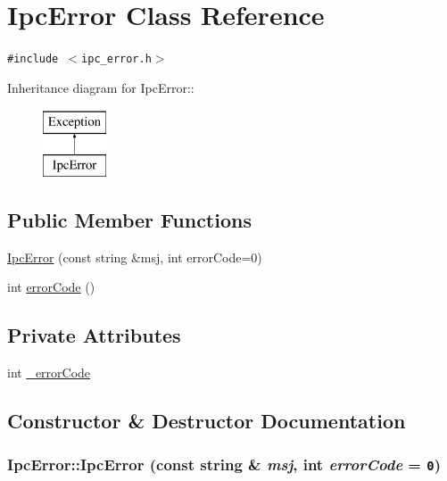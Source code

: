\hypertarget{classIpcError}{
\section{IpcError Class Reference}
\label{classIpcError}
}
{\tt \#include $<$ipc\_\-error.h$>$}

Inheritance diagram for IpcError::\begin{figure}[H]
\begin{center}
\leavevmode
\includegraphics[height=2cm]{classIpcError}
\end{center}
\end{figure}
\subsection*{Public Member Functions}
\begin{CompactItemize}
\item 
\hyperlink{classIpcError_daad480b7616244be5e2610d72a7aaa4}{IpcError} (const string \&msj, int errorCode=0)
\item 
int \hyperlink{classIpcError_f8aa4933424ab14450ba84580ed3d499}{errorCode} ()
\end{CompactItemize}
\subsection*{Private Attributes}
\begin{CompactItemize}
\item 
int \hyperlink{classIpcError_8aeb5f5a69cc82717ac320000023a3f9}{\_\-errorCode}
\end{CompactItemize}


\subsection{Constructor \& Destructor Documentation}
\hypertarget{classIpcError_daad480b7616244be5e2610d72a7aaa4}{
\subsubsection[{IpcError}]{\setlength{\rightskip}{0pt plus 5cm}IpcError::IpcError (const string \& {\em msj}, \/  int {\em errorCode} = {\tt 0})}}
\label{classIpcError_daad480b7616244be5e2610d72a7aaa4}




